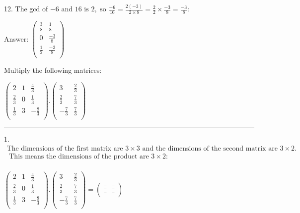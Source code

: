 \documentclass{article}
\begin{document}
12. The gcd of $-6\text{ and 16 is }2,\text{ so }\frac{-6}{16}=\frac{2 (-3)}{2\times 8}=\frac{2}{2}\times \frac{-3}{8}=\frac{-3}{8}$:

Answer: $\left(
\begin{array}{cc}
\frac{3}{8} & \frac{1}{8} \\
 0 & \frac{-3}{8} \\
 \frac{1}{2} & \frac{-3}{8} \\
\end{array}
\right)$

\pagebreak

Multiply the following matrices:

$\left(
        \begin{array}{ccc}
2           & 1 & \frac{4}{3}  \\
                \frac{2}{3} & 0 & \frac{1}{3}  \\
                \frac{1}{3} & 3 & -\frac{8}{3} \\
            \end{array}
        \right).\left(
        \begin{array}{cc}
3            & \frac{2}{3} \\
                \frac{2}{3}  & \frac{7}{3} \\
                -\frac{7}{3} & \frac{7}{3} \\
            \end{array}
        \right)$

\hrule

1. $\begin{array}{l}
\text{The dimensions of the first matrix are }3\times 3\text{ and the dimensions of the second matrix are }3\times 2. \\
\text{            This means the dimensions of the product are }3\times 2:                                                                                                  \\
        \end{array}$

$\left(
        \begin{array}{ccc}
2           & 1 & \frac{4}{3}  \\
                \frac{2}{3} & 0 & \frac{1}{3}  \\
                \frac{1}{3} & 3 & -\frac{8}{3} \\
            \end{array}
        \right).\left(
        \begin{array}{cc}
3            & \frac{2}{3} \\
                \frac{2}{3}  & \frac{7}{3} \\
                -\frac{7}{3} & \frac{7}{3} \\
            \end{array}
        \right)=\left(
        \begin{array}{cc}
\_ & \_ \\
                \_ & \_ \\
                \_ & \_ \\
            \end{array}
        \right)$
\end{document}
